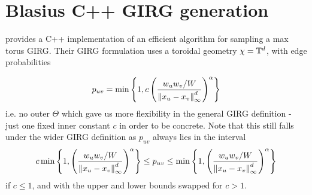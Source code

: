 



\section{Blasius C++ GIRG generation}
\label{sec:blasius_cpp_generation}
\cite{blasius2022efficiently} provides a C++ implementation of an efficient algorithm for sampling a max torus GIRG.
Their GIRG formulation uses a toroidal geometry $\chi = \mathbb{T}^d$, with edge probabilities 

\begin{equation}
    p_{uv} = \min \left \{ 
        1,
        c \left (
            \frac{w_u w_v / W}{\left\lVert x_u - x_v\right\rVert_\infty^d}
        \right )^\alpha    
    \right \}
    \label{eq:blasius_GIRG_puv}
\end{equation}
i.e. no outer $\Theta$ which gave us more flexibility in the general GIRG definition - just one fixed inner constant $c$ in order to be concrete. 
Note that this still falls under the wider GIRG definition 
as $p_{uv}$ always lies in the interval 
\begin{equation}
    c \min \left \{ 
        1,
        \left (
            \frac{w_u w_v / W}{\left\lVert x_u - x_v\right\rVert_\infty^d}
        \right )^\alpha    
    \right \} \leq p_{uv} \leq \min \left \{ 
        1,
        \left (
            \frac{w_u w_v / W}{\left\lVert x_u - x_v\right\rVert_\infty^d}
        \right )^\alpha    
    \right \}
\end{equation}
if $c \leq 1$, and with the upper and lower bounds swapped for $c > 1$.



